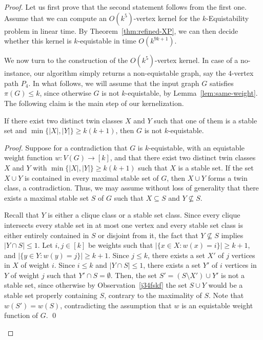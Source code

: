 \documentclass{llncs}
\begin{document}
\begin{proof}
Let us first prove that the second statement follows from the first one. Assume that we can compute an $O(k^5)$-vertex kernel for the {\sc $k$-Equistability} problem in linear time. By Theorem~\ref{thm:refined-XP}, we can then decide whether this kernel is $k$-equistable in time $O(k^{9k+1})$.

We now turn to the construction of the $O(k^5)$-vertex kernel.
In case of a no-instance, our algorithm simply returns a non-equistable graph, say the $4$-vertex path $P_4$.
In what follows, we will assume that the input graph $G$ satisfies $\pi(G)\le k$, since otherwise $G$ is not $k$-equistable, by Lemma~\ref{lem:same-weight}.
The following claim is the main step of our kernelization.

\begin{Claim}\label{clm:big-classes}
If there exist
two distinct twin classes $X$ and $Y$ such that
one of them is a stable set and $\min\{|X|,|Y|\}\ge k(k+1)$,
then $G$ is not $k$-equistable.
\end{Claim}

\begin{proof}
Suppose for a contradiction that $G$ is $k$-equistable, with an equistable weight function $w:V(G)\to [k]$, and that there exist
two distinct twin classes $X$ and $Y$ with $\min\{|X|,|Y|\}\ge k(k+1)$ such that $X$ is a stable set.
If the set $X\cup Y$ is contained in every maximal stable set of $G$, then $X\cup Y$ forms a twin class, a contradiction.
Thus, we may assume without loss of generality that there exists a maximal stable set $S$ of $G$
such that $X\subseteq S$ and $Y\nsubseteq S$.

Recall that $Y$ is either a clique class or a stable set class.
Since every clique intersects every stable set in at most one vertex
and every stable set class is either entirely contained in $S$ or disjoint from it,
the fact that $Y\nsubseteq S$ implies $|Y\cap S|\le 1$.
Let $i,j\in [k]$ be weights such that $|\{x\in X:w(x) = i\}|\ge k+1$, and
$|\{y\in Y:w(y) = j\}|\ge k+1$. Since $j\le k$, there exists a set $X'$ of $j$ vertices in $X$ of weight $i$.
Since $i\le k$ and $|Y\cap S|\le 1$, there exists a set $Y'$ of $i$ vertices in $Y$ of weight $j$ such that
$Y'\cap S=\emptyset$. Then, the set $S' = (S \setminus X')\cup Y'$ is not a stable set, since
otherwise by Observation~\ref{j34fskf} the set $S\cup Y$ would be a stable set properly containing $S$, contrary to the  maximality of $S$.
Note that $w(S') = w(S)$, contradicting the assumption that $w$ is an equistable weight function of $G$.
\qed \end{proof}


\end{proof}
\end{document}
